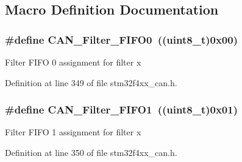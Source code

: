 \subsection{Macro Definition Documentation}
\hypertarget{group___c_a_n__filter___f_i_f_o_ga8249c27978ca94676530540b88a6be8f}{
\subsubsection[{C\-A\-N\-\_\-\-Filter\-\_\-\-F\-I\-F\-O0}]{\setlength{\rightskip}{0pt plus 5cm}\#define C\-A\-N\-\_\-\-Filter\-\_\-\-F\-I\-F\-O0~((uint8\-\_\-t)0x00)}}\label{group___c_a_n__filter___f_i_f_o_ga8249c27978ca94676530540b88a6be8f}
Filter F\-I\-F\-O 0 assignment for filter x 

Definition at line 349 of file stm32f4xx\-\_\-can.\-h.

\hypertarget{group___c_a_n__filter___f_i_f_o_gaab8478c89a607c4b8baf68efc730e316}{
\subsubsection[{C\-A\-N\-\_\-\-Filter\-\_\-\-F\-I\-F\-O1}]{\setlength{\rightskip}{0pt plus 5cm}\#define C\-A\-N\-\_\-\-Filter\-\_\-\-F\-I\-F\-O1~((uint8\-\_\-t)0x01)}}\label{group___c_a_n__filter___f_i_f_o_gaab8478c89a607c4b8baf68efc730e316}
Filter F\-I\-F\-O 1 assignment for filter x 

Definition at line 350 of file stm32f4xx\-\_\-can.\-h.

